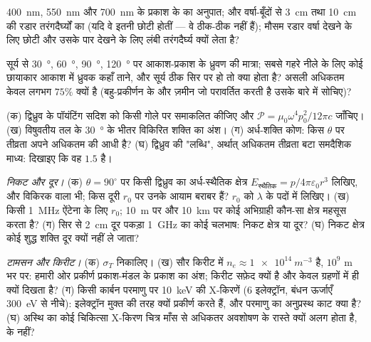 \begin{exercise}[$\star$]\label{exo:b2:dipole-radiation:3}
\qty{400}{nm}, \qty{550}{nm} और \qty{700}{nm} के प्रकाश के  का
अनुपात; और वर्षा-बूँदों से \qty{3}{cm} तथा \qty{10}{cm} की रडार तरंगदैर्घ्यों का
(यदि वे इतनी छोटी होतीं --- वे ठीक-ठीक नहीं हैं); मौसम रडार
वर्षा देखने के लिए छोटी और उसके पार देखने के लिए लंबी तरंगदैर्घ्य क्यों लेता है?
\end{exercise}

\begin{exercise}[$\star$]\label{exo:b2:dipole-radiation:4}
सूर्य से \qty{30}{\degree}, \qty{60}{\degree}, \qty{90}{\degree}, \qty{120}{\degree} पर
आकाश-प्रकाश के ध्रुवण की मात्रा; सबसे गहरे नीले के लिए कोई छायाकार
आकाश में ध्रुवक कहाँ ताने, और सूर्य ठीक सिर पर हो तो क्या
होता है? असली अधिकतम केवल लगभग
$75\%$ क्यों है (बहु-प्रकीर्णन के और ज़मीन जो परावर्तित करती है उसके बारे में सोचिए)?
\end{exercise}

\begin{exercise}[$\star\star$]\label{exo:b2:dipole-radiation:5}
(क) द्विध्रुव के पॉयंटिंग सदिश को किसी गोले पर समाकलित कीजिए और
$\mathcal P = \mu_0\omega^4p_0^2/12\pi c$ जाँचिए। (ख) विषुवतीय तल के \qty{30}{\degree} के
भीतर विकिरित शक्ति का अंश। (ग) अर्ध-शक्ति
कोण: किस $\theta$ पर तीव्रता अपने अधिकतम की आधी है? (घ) द्विध्रुव की
"लब्धि", अर्थात् अधिकतम तीव्रता बटा समदैशिक माध्य:
दिखाइए कि वह $1.5$ है।
\end{exercise}

\begin{exercise}[$\star\star$]\label{exo:b2:dipole-radiation:6}
\emph{निकट और दूर।} (क) $\theta = 90^\circ$ पर किसी द्विध्रुव का अर्ध-स्थैतिक क्षेत्र
$E_{\text{स्थैतिक}} = p/4\pi\varepsilon_0r^3$ लिखिए, और विकिरक वाला भी; किस
दूरी $r_0$ पर उनके आयाम बराबर हैं? $r_0$ को $\lambda$ के पदों में
लिखिए। (ख) किसी \qty{1}{MHz} ऐंटेना के लिए $r_0$; \qty{10}{m} पर और \qty{10}{km} पर
कोई अभिग्राही कौन-सा क्षेत्र महसूस करता है? (ग) सिर से \qty{2}{cm} दूर पकड़ा
\qty{1}{GHz} का कोई चलभाष: निकट क्षेत्र या दूर? (घ) निकट क्षेत्र
कोई शुद्ध शक्ति दूर क्यों नहीं ले जाता?
\end{exercise}

\begin{exercise}[$\star\star$]\label{exo:b2:dipole-radiation:7}
\emph{टामसन और किरीट।} (क) $\sigma_T$ निकालिए। (ख) सौर किरीट में
$n_e \approx \qty{1e14}{m^{-3}}$ है, $10^9$ m भर पर: हमारी ओर प्रकीर्ण प्रकाश-मंडल के
प्रकाश का अंश; किरीट सफ़ेद क्यों है और केवल ग्रहणों में ही क्यों दिखता है?
(ग) किसी कार्बन परमाणु पर \qty{10}{keV} की X-किरणें ($6$
इलेक्ट्रॉन, बंधन ऊर्जाएँ \qty{300}{eV} से नीचे): इलेक्ट्रॉन मुक्त की तरह
क्यों प्रकीर्ण करते हैं, और परमाणु का अनुप्रस्थ काट क्या है? (घ) अस्थि का
कोई चिकित्सा X-किरण चित्र माँस से अधिकतर अवशोषण के रास्ते क्यों अलग होता
है,  के नहीं?
\end{exercise}

